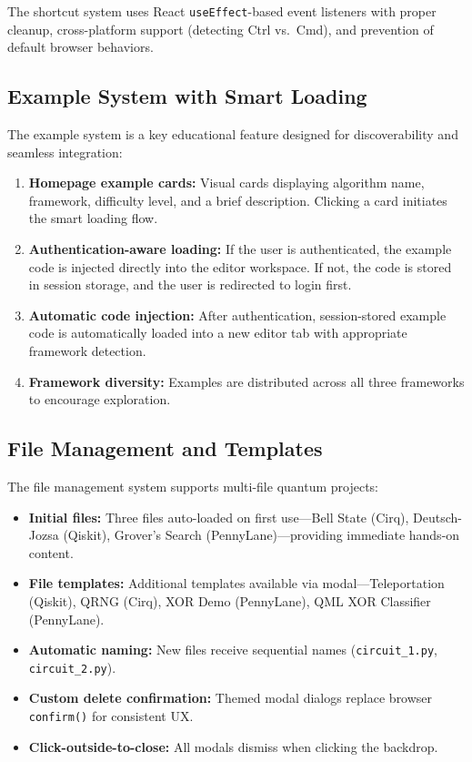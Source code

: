 \documentclass[conference]{IEEEtran}
\begin{document}
The shortcut system uses React \texttt{useEffect}-based event listeners with proper cleanup, cross-platform support (detecting Ctrl vs.\ Cmd), and prevention of default browser behaviors.

\subsection{Example System with Smart Loading}

The example system is a key educational feature designed for discoverability and seamless integration:

\begin{enumerate}
    \item \textbf{Homepage example cards:} Visual cards displaying algorithm name, framework, difficulty level, and a brief description. Clicking a card initiates the smart loading flow.
    \item \textbf{Authentication-aware loading:} If the user is authenticated, the example code is injected directly into the editor workspace. If not, the code is stored in session storage, and the user is redirected to login first.
    \item \textbf{Automatic code injection:} After authentication, session-stored example code is automatically loaded into a new editor tab with appropriate framework detection.
    \item \textbf{Framework diversity:} Examples are distributed across all three frameworks to encourage exploration.
\end{enumerate}

\subsection{File Management and Templates}

The file management system supports multi-file quantum projects:

\begin{itemize}
    \item \textbf{Initial files:} Three files auto-loaded on first use---Bell State (Cirq), Deutsch-Jozsa (Qiskit), Grover's Search (PennyLane)---providing immediate hands-on content.
    \item \textbf{File templates:} Additional templates available via modal---Teleportation (Qiskit), QRNG (Cirq), XOR Demo (PennyLane), QML XOR Classifier (PennyLane).
    \item \textbf{Automatic naming:} New files receive sequential names (\texttt{circuit\_1.py}, \texttt{circuit\_2.py}).
    \item \textbf{Custom delete confirmation:} Themed modal dialogs replace browser \texttt{confirm()} for consistent UX.
    \item \textbf{Click-outside-to-close:} All modals dismiss when clicking the backdrop.
\end{itemize}
\end{document}
